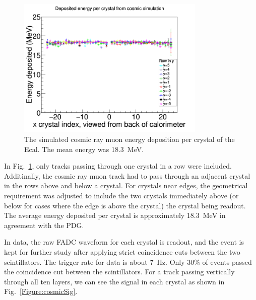 \begin{figure}[H]
  \centering
      \includegraphics[width=0.8\textwidth]{pics/performance/cosmicEdep.png}
  \caption[Simulation of energy deposited per Ecal module from cosmic rays]{The simulated cosmic ray muon energy deposition per crystal of the Ecal. The mean energy was 18.3~MeV.}
  \label{Figure:cosmicEdep}
\end{figure}

In Fig.~\ref{Figure:cosmicEdep}, only tracks passing through one crystal in a row were included. Additinally, the cosmic ray muon track had to pass through an adjacent crystal in the rows above and below a crystal. For crystals near edges, the geometrical requirement was adjusted to include the two crystals immediately above (or below for cases where the edge is above the crystal) the crystal being readout. The average energy deposited per crystal is approximately 18.3~MeV in agreement with the PDG. 

In data, the raw FADC waveform for each crystal is readout, and the event is kept for further study after applying strict coincidence cuts between the two scintillators. The trigger rate for data is about 7~Hz. Only 30$\%$ of events passed the coincidence cut between the scintillators. For a track passing vertically through all ten layers, we can see the signal in each crystal as shown in Fig.~\ref{Figure:cosmicSig}.

